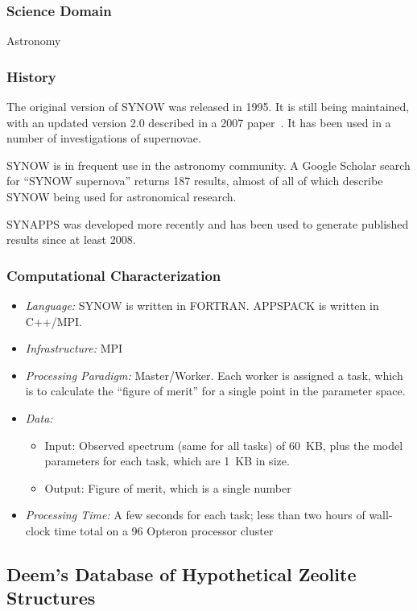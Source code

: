 \documentclass[10pt,letterpaper]{article}
\begin{document}
\subsubsection{Science Domain} Astronomy

\subsubsection{History}
The original version of SYNOW was released in 1995.
It is still being maintained, with an updated version 2.0 described in a
2007 paper~\cite{branch-synow-07}.  It has been used in a number of investigations
of supernovae.

SYNOW is in frequent use in the astronomy community.  A Google Scholar search for ``SYNOW supernova''
 returns 187 results, almost of all of which describe SYNOW being used for  astronomical research.

SYNAPPS was developed more recently and has been used to generate published
results since at least 2008.

\subsubsection{Computational Characterization}

\begin {itemize}
\item {\em Language:} SYNOW is written in FORTRAN. APPSPACK is written in C++/MPI.
\item {\em Infrastructure:} MPI
\item {\em Processing Paradigm:} Master/Worker.  Each worker is assigned a task, which is
            to calculate the ``figure of merit'' for a single point in the parameter space.
\item {\em Data:} \begin{itemize}
    \item Input: Observed spectrum (same for all tasks) of 60~KB, plus the model parameters for each task, which are 1~KB in size.
    \item Output: Figure of merit, which is a single number
    \end{itemize}
\item {\em Processing Time:} A few seconds for each task; less than two hours of wall-clock time
                total on a 96 Opteron processor cluster
\end {itemize}


\subsection{Deem's Database of Hypothetical Zeolite Structures}
\end{document}
